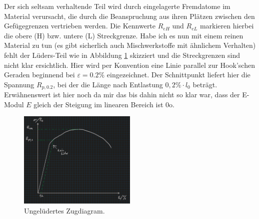 Der sich seltsam verhaltende Teil wird durch eingelagerte Fremdatome im Material verursacht, die durch die Beanspruchung
aus ihren Plätzen zwischen den Gefügegrenzen vertrieben werden. Die Kennwerte \(R_{eH}\) und \(R_{eL}\) markieren hierbei
die obere (H) bzw. untere (L) Streckgrenze.
Habe ich es nun mit einem reinen Material zu tun (es gibt sicherlich auch Mischwerkstoffe mit ähnlichem Verhalten) fehlt
der Lüders-Teil wie in Abbildung \ref{fig:zug} skizziert und die Streckgrenzen sind nicht klar ersichtlich. Hier wird per
Konvention eine Linie parallel zur Hook'schen Geraden beginnend bei \(\varepsilon = 0.2\%\) eingezeichnet. Der Schnittpunkt
liefert hier die Spannung \(R_{p,0.2}\), bei der die Länge nach Entlastung \(0,2\%\cdot l_0\) beträgt. Erwähnenswert ist
hier noch da mir das bis dahin nicht so klar war, dass der E-Modul \(E\) gleich der Steigung im linearen Bereich ist 0o.
\begin{figure}[h]
    \centering
    \includegraphics[width=0.5\textwidth]{entries/6/zug.jpg}
    \caption{Ungelüdertes Zugdiagram.}
    \label{fig:zug}
\end{figure}

